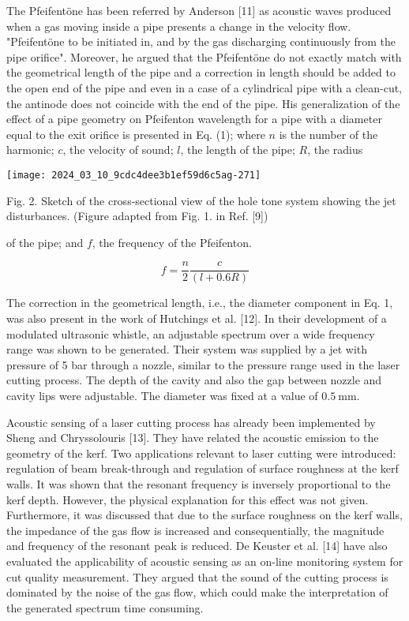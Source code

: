 \documentclass[10pt]{article}
\begin{document}
The Pfeifentöne has been referred by Anderson [11] as acoustic waves produced when a gas moving inside a pipe presents a change in the velocity flow. "Pfeifentöne to be initiated in, and by the gas discharging continuously from the pipe orifice". Moreover, he argued that the Pfeifentöne do not exactly match with the geometrical length of the pipe and a correction in length should be added to the open end of the pipe and even in a case of a cylindrical pipe with a clean-cut, the antinode does not coincide with the end of the pipe. His generalization of the effect of a pipe geometry on Pfeifenton wavelength for a pipe with a diameter equal to the exit orifice is presented in Eq. (1); where $n$ is the number of the harmonic; $c$, the velocity of sound; $l$, the length of the pipe; $R$, the radius

\begin{center}
\texttt{[image: 2024\_03\_10\_9cdc4dee3b1ef59d6c5ag-271]}
\end{center}

Fig. 2. Sketch of the cross-sectional view of the hole tone system showing the jet disturbances. (Figure adapted from Fig. 1. in Ref. [9])

of the pipe; and $f$, the frequency of the Pfeifenton.


\begin{equation*}
f=\frac{n}{2} \frac{c}{(l+0.6 R)} \tag{1}
\end{equation*}


The correction in the geometrical length, i.e., the diameter component in Eq. 1, was also present in the work of Hutchings et al. [12]. In their development of a modulated ultrasonic whistle, an adjustable spectrum over a wide frequency range was shown to be generated. Their system was supplied by a jet with pressure of 5 bar through a nozzle, similar to the pressure range used in the laser cutting process. The depth of the cavity and also the gap between nozzle and cavity lips were adjustable. The diameter was fixed at a value of $0.5 \mathrm{~mm}$.

Acoustic sensing of a laser cutting process has already been implemented by Sheng and Chryssolouris [13]. They have related the acoustic emission to the geometry of the kerf. Two applications relevant to laser cutting were introduced: regulation of beam break-through and regulation of surface roughness at the kerf walls. It was shown that the resonant frequency is inversely proportional to the kerf depth. However, the physical explanation for this effect was not given. Furthermore, it was discussed that due to the surface roughness on the kerf walls, the impedance of the gas flow is increased and consequentially, the magnitude and frequency of the resonant peak is reduced. De Keuster et al. [14] have also evaluated the applicability of acoustic sensing as an on-line monitoring system for cut quality measurement. They argued that the sound of the cutting process is dominated by the noise of the gas flow, which could make the interpretation of the generated spectrum time consuming.
\end{document}
